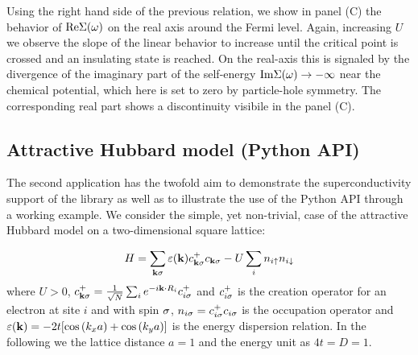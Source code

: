 \documentclass[edipack2.tex]{subfiles}
\begin{document}
Using the right hand side of the previous relation, we show in
panel (C) the behavior of  ${\rm Re}\Sigma(\omega)$
on the real axis around the Fermi level. Again, increasing $U$
we observe the slope of the linear behavior to increase until the
critical point is crossed and an insulating state is reached. On the
real-axis this is signaled by the divergence of the imaginary part of
the self-energy   ${\rm Im}\Sigma(\omega) \rightarrow -\infty$
near the chemical potential, which here is set to zero by
particle-hole symmetry. The corresponding real part shows a
discontinuity visibile in the panel (C). 


\subsection{Attractive Hubbard model (Python API)}\label{SecExamplesAHM}
The second application has the twofold aim to demonstrate the
superconductivity support of the \NAME library as well as to
illustrate the use of the Python API through a working example.
We consider the simple, yet non-trivial, case of the attractive
Hubbard model on a two-dimensional square lattice:

$$
H = \sum_{{\bf k}\sigma} \varepsilon({\bf k})c^+_{{\bf k}\sigma}c_{{\bf k}\sigma} -U\sum_i n_{i\uparrow}n_{i\downarrow}
$$
where $U>0$, $c^+_{{\bf k}\sigma}=\tfrac{1}{\sqrt{N}}\sum_i e^{-i{\bf k}\cdot R_i} c^+_{i\sigma}$
and $c^+_{i\sigma}$ is the creation operator for an electron at site $i$
and with spin $\sigma$, $n_{i\sigma}=c^+_{i\sigma}c_{i\sigma}$ is the occupation
operator and $\varepsilon({\bf k})=-2t[\cos{(k_x a)}+ \cos{(k_y a)}]$ is the
energy dispersion relation. In the following we the lattice distance
$a=1$  and the energy unit as $4t=D=1$.
\end{document}

